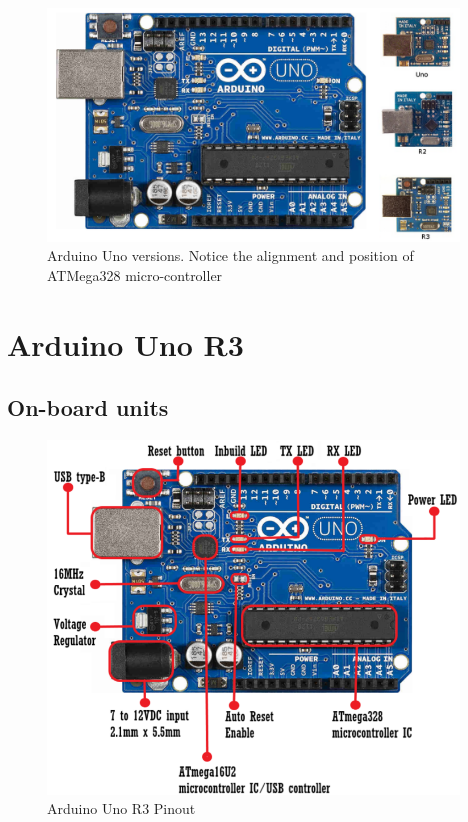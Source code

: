 \begin{figure}
    \centering
    \includegraphics[width=4.3in]{Images/Intro_Arduino/arduino_uno_versions.png}
    \caption[Arduino Uno version]{Arduino Uno versions. Notice the alignment and position of ATMega328 micro-controller}
\end{figure}


\newpage
\section{Arduino Uno R3}
    \subsection{On-board units}
    
    \begin{figure}
        \centering
        \includegraphics[width=4.3in]{Images/Intro_Arduino/uno_desp.png}
        \caption{Arduino Uno R3 Pinout}
    \end{figure}
    
